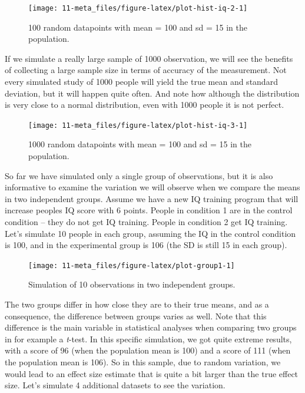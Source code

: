 \documentclass[
  oneside]{book}
\begin{document}
\begin{figure}

{\centering \texttt{[image: 11-meta\_files/figure-latex/plot-hist-iq-2-1]} 

}

\caption{100 random datapoints with mean = 100 and sd = 15 in the population.}\label{fig:plot-hist-iq-2}
\end{figure}

If we simulate a really large sample of 1000 observation, we will see the benefits of collecting a large sample size in terms of accuracy of the measurement. Not every simulated study of 1000 people will yield the true mean and standard deviation, but it will happen quite often. And note how although the distribution is very close to a normal distribution, even with 1000 people it is not perfect.



\begin{figure}

{\centering \texttt{[image: 11-meta\_files/figure-latex/plot-hist-iq-3-1]} 

}

\caption{1000 random datapoints with mean = 100 and sd = 15 in the population.}\label{fig:plot-hist-iq-3}
\end{figure}

So far we have simulated only a single group of observations, but it is also informative to examine the variation we will observe when we compare the means in two independent groups. Assume we have a new IQ training program that will increase peoples IQ score with 6 points. People in condition 1 are in the control condition -- they do not get IQ training. People in condition 2 get IQ training. Let's simulate 10 people in each group, assuming the IQ in the control condition is 100, and in the experimental group is 106 (the SD is still 15 in each group).



\begin{figure}

{\centering \texttt{[image: 11-meta\_files/figure-latex/plot-group1-1]} 

}

\caption{Simulation of 10 observations in two independent groups.}\label{fig:plot-group1}
\end{figure}

The two groups differ in how close they are to their true means, and as a consequence, the difference between groups varies as well. Note that this difference is the main variable in statistical analyses when comparing two groups in for example a \emph{t}-test. In this specific simulation, we got quite extreme results, with a score of 96 (when the population mean is 100) and a score of 111 (when the population mean is 106). So in this sample, due to random variation, we would lead to an effect size estimate that is quite a bit larger than the true effect size. Let's simulate 4 additional datasets to see the variation.
\end{document}
